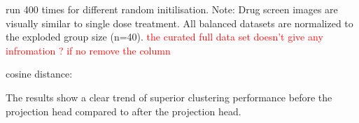     

run 400 times for different random initilisation. Note: Drug screen images are visually similar to single dose treatment. All balanced datasets
 are normalized to the exploded group size (n=40).
 \textcolor{red}{the curated full data set doesn't give any infromation ? if no remove the column}


    \begin{table}[H]
        \centering
        \caption{Evaluation Results on Different Datasets and Augmentations with cosine distance}
        \label{tab:evaluation_results_cosine_distance}
    \end{table}
    

cosine distance:

The results show a clear trend of superior clustering performance before the projection head compared to after the projection head.


